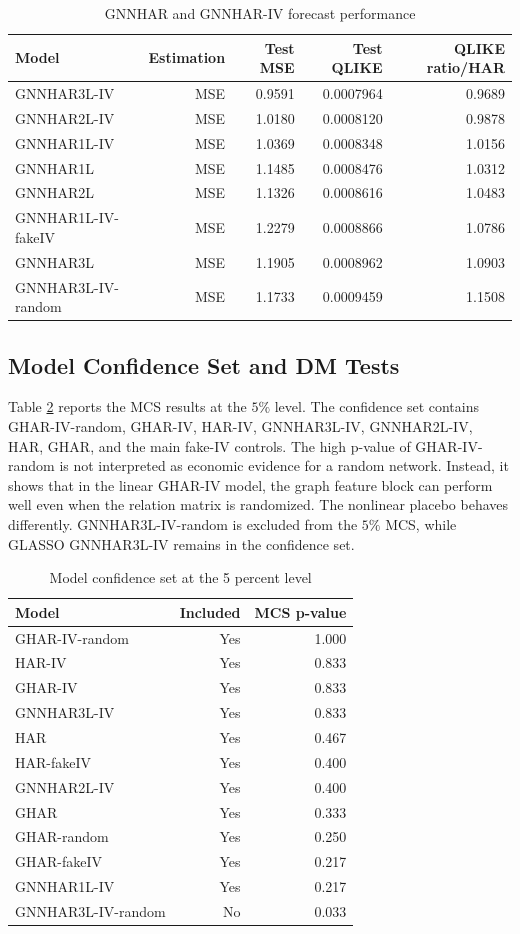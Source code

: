 \documentclass[11pt,a4paper]{article}
\begin{document}
\begin{table}[t]
\centering
\caption{GNNHAR and GNNHAR-IV forecast performance}
\label{tab:gnnloss}
\begin{tabular}{lrrrr}
\toprule
Model & Estimation & Test MSE & Test QLIKE & QLIKE ratio/HAR \\
\midrule
GNNHAR3L-IV & MSE & 0.9591 & 0.0007964 & 0.9689 \\
GNNHAR2L-IV & MSE & 1.0180 & 0.0008120 & 0.9878 \\
GNNHAR1L-IV & MSE & 1.0369 & 0.0008348 & 1.0156 \\
GNNHAR1L & MSE & 1.1485 & 0.0008476 & 1.0312 \\
GNNHAR2L & MSE & 1.1326 & 0.0008616 & 1.0483 \\
GNNHAR1L-IV-fakeIV & MSE & 1.2279 & 0.0008866 & 1.0786 \\
GNNHAR3L & MSE & 1.1905 & 0.0008962 & 1.0903 \\
GNNHAR3L-IV-random & MSE & 1.1733 & 0.0009459 & 1.1508 \\
\bottomrule
\end{tabular}
\end{table}

\subsection{Model Confidence Set and DM Tests}

Table \ref{tab:mcs} reports the MCS results at the \(5\%\) level. The confidence set contains
GHAR-IV-random, GHAR-IV, HAR-IV, GNNHAR3L-IV, GNNHAR2L-IV, HAR, GHAR, and the main
fake-IV controls. The high p-value of GHAR-IV-random is not interpreted as economic evidence
for a random network. Instead, it shows that in the linear GHAR-IV model, the graph
feature block can perform well even when the relation matrix is randomized. The nonlinear placebo
behaves differently. GNNHAR3L-IV-random is excluded from the \(5\%\) MCS, while GLASSO
GNNHAR3L-IV remains in the confidence set.

\begin{table}[t]
\centering
\caption{Model confidence set at the 5 percent level}
\label{tab:mcs}
\begin{tabular}{lrr}
\toprule
Model & Included & MCS p-value \\
\midrule
GHAR-IV-random & Yes & 1.000 \\
HAR-IV & Yes & 0.833 \\
GHAR-IV & Yes & 0.833 \\
GNNHAR3L-IV & Yes & 0.833 \\
HAR & Yes & 0.467 \\
HAR-fakeIV & Yes & 0.400 \\
GNNHAR2L-IV & Yes & 0.400 \\
GHAR & Yes & 0.333 \\
GHAR-random & Yes & 0.250 \\
GHAR-fakeIV & Yes & 0.217 \\
GNNHAR1L-IV & Yes & 0.217 \\
GNNHAR3L-IV-random & No & 0.033 \\
\bottomrule
\end{tabular}
\end{table}
\end{document}
